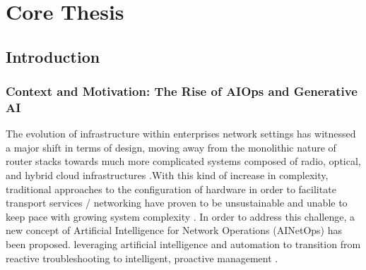 \documentclass[11pt,a4paper]{report}
\begin{document}
\listoftables
\clearpage


\part*{Core Thesis}

\clearpage
{}
\setcounter{page}{1}

\chapter{Introduction}
\section{Context and Motivation: The Rise of AIOps and Generative AI}
The evolution of infrastructure within enterprises network settings has witnessed a major shift in terms of design, moving away from the monolithic nature of router stacks towards much more complicated systems composed of radio, optical, and hybrid cloud infrastructures  \cite{GN5-2-White-Paper_Gen-AI-in-Network-Management,Real-Time_Topology-Aware_LogMetric_Correlation_for_LLM-based_Root_Cause_Analysis_in_Distributed_Systems}.With this kind of increase in complexity, traditional approaches to the configuration of hardware in order to facilitate transport services / networking have proven to be unsustainable and unable to keep pace with growing system complexity  \cite{A_Survey_on_Intent-Based_Networking,An-LLM-based-Agentic-Framework-for-Accessible-Network-Control}.  In order to address this challenge, a new concept of Artificial Intelligence for Network Operations (\gls{AINetOps}) has been proposed. leveraging artificial intelligence and automation to transition from reactive troubleshooting to intelligent, proactive management  \cite{Artificial-Intelligence-AI-for-Network-Operations}.
\end{document}
